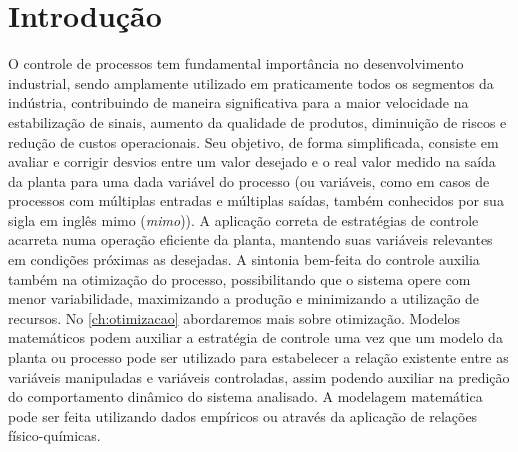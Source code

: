 \chapter{Introdução}
\label{ch:introducao}

O controle de processos tem fundamental importância no desenvolvimento industrial,
sendo amplamente utilizado em praticamente todos os segmentos da indústria,
contribuindo de maneira significativa para a maior velocidade na estabilização de sinais,
aumento da qualidade de produtos, diminuição de riscos e redução de custos operacionais.
Seu objetivo, de forma simplificada, consiste em avaliar e corrigir desvios entre um
valor desejado e o real valor medido na saída da planta para uma dada variável do
processo (ou variáveis, como em casos de processos com múltiplas entradas e múltiplas
saídas, também conhecidos por sua sigla em inglês \acrshort{mimo} (\textit{\acrlong{mimo}})).
A aplicação correta de estratégias de controle acarreta numa operação eficiente da
planta, mantendo suas variáveis relevantes em condições próximas as desejadas.
A sintonia bem-feita do controle auxilia também na otimização do processo,
possibilitando que o sistema opere com menor variabilidade, maximizando a produção
e minimizando a utilização de recursos. No \cref{ch:otimizacao} abordaremos mais
sobre otimização.
Modelos matemáticos podem auxiliar a estratégia de controle uma vez que um modelo da
planta ou processo pode ser utilizado para estabelecer a relação existente entre as
variáveis manipuladas e variáveis controladas, assim podendo auxiliar na predição do
comportamento dinâmico do sistema analisado. A modelagem matemática pode ser feita
utilizando dados empíricos ou através da aplicação de relações físico-químicas.

